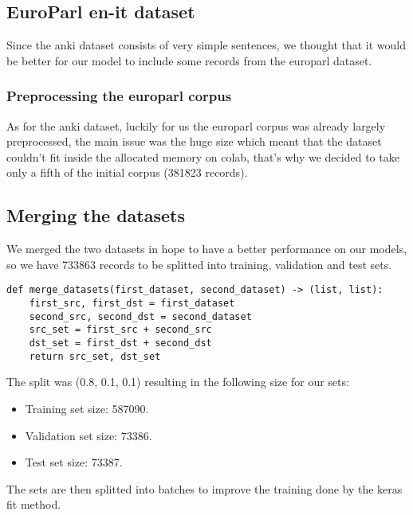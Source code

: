 \subsection{EuroParl en-it dataset}
Since the anki dataset consists of very simple sentences, we thought that it would be better for our model to include some records from the europarl dataset.
\subsubsection{Preprocessing the europarl corpus}
As for the anki dataset, luckily for us the europarl corpus was already largely preprocessed, the main issue was the huge size which meant that the dataset couldn't fit inside the allocated memory on colab, that's why we decided to take only a fifth of the initial corpus (381823 records).
\begin{comment}
\begin{verbatim}
def create_dataset_euparl(name: str, src: str = "en", dst: str = "it",
                        size: float = 1) -> (list, list):
    with open(name+".{0}".format(src), encoding="UTF-8") as datafile:
        src_set = datafile.readlines()

    with open(name+".{0}".format(dst), encoding="UTF-8") as datafile:
        dst_set = datafile.readlines()

    if size != 1:
        if size > 1 or size < 0:
            raise ValueError("No correct size for the euparl corpus")
        
        datasets_to_shuffle = list((zip(src_set, dst_set)))
        np.random.shuffle(datasets_to_shuffle)
        src_set, dst_set = zip(*datasets_to_shuffle)
        src_set = list(src_set[:int(len(src_set) * size)])
        dst_set = list(dst_set[:int(len(dst_set) * size)])
        
    return src_set, dst_set
\end{verbatim}
\end{comment}
\subsection{Merging the datasets}
We merged the two datasets in hope to have a better performance on our models, so we have 733863 records to be splitted into training, validation and test sets.
\begin{verbatim}
def merge_datasets(first_dataset, second_dataset) -> (list, list):
    first_src, first_dst = first_dataset
    second_src, second_dst = second_dataset
    src_set = first_src + second_src
    dst_set = first_dst + second_dst
    return src_set, dst_set
\end{verbatim}
The split was (0.8, 0.1, 0.1) resulting in the following size for our sets:
\begin{itemize}
    \item Training set size: 587090.
    \item Validation set size: 73386.
    \item Test set size: 73387.
\end{itemize}
The sets are then splitted into batches to improve the training done by the keras fit method.
